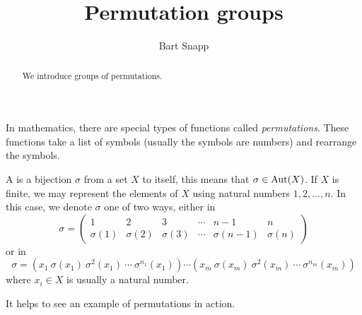 \documentclass{ximera}
\author{Bart Snapp}
\title{Permutation groups}
\begin{document}
\begin{abstract}
  We introduce groups of permutations. 
\end{abstract}
\maketitle

In mathematics, there are special types of functions called
\textit{permutations}. These functions take a list of symbols (usually
the symbols are numbers) and rearrange the symbols.  

\begin{definition}
  A  is a bijection $\sigma$ from a set $X$ to
  itself, this means that $\sigma\in\operatorname{Aut}(X)$. If $X$ is finite,
  we may represent the elements of $X$ using natural numbers
  $1,2,\dots,n$. In this case, we denote $\sigma$ one of two ways,
  either in 
  \[
  \sigma = \left(\begin{smallmatrix}
    1 & 2 & 3 & \cdots & n-1 & n \\
    \sigma(1) & \sigma(2) & \sigma(3) & \cdots &  \sigma(n-1)  & \sigma(n)
  \end{smallmatrix}\right)
  \]
  or in 
  \[
  \sigma = (x_1\ \sigma(x_1)\ \sigma^2(x_1)\ \cdots\ \sigma^{n_1}(x_1)) \cdots (x_m \ \sigma(x_m)\ \sigma^2(x_m)\ \cdots\ \sigma^{n_m}(x_m))
  \]
  where $x_i\in X$ is usually a natural number.
\end{definition}


It helps to see an example of permutations in action.
\end{document}

